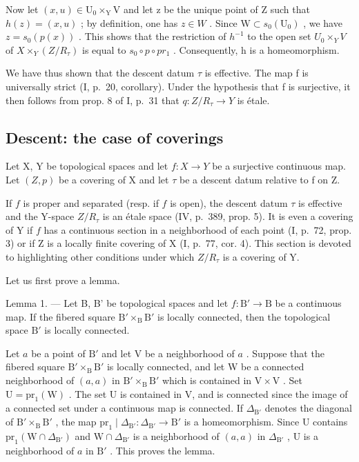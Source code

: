 Now let \((x,u)\in\mathrm{U}_{0}\times_{\mathrm{Y}}\mathrm{V}\) and let z be the unique point of Z such that \(h(z)=(x,u)\) ; by definition, one has \(z\in W\) . Since \(\mathrm{W}\subset s_{0}(\mathrm{U}_{0})\) , we have \(z=s_{0}(p(x))\) . This shows that the restriction of \(h^{-1}\) to the open set \(U_{0}\times_{Y}V\) of \(X\times_{Y}(Z/R_{\tau})\) is equal to \(s_{0}\circ p\circ pr_{1}\) . Consequently, h is a homeomorphism.

We have thus shown that the descent datum \(\tau\) is effective. The map f is universally strict (I, p.~20, corollary). Under the hypothesis that f is surjective, it then follows from prop. 8 of I, p.~31 that \(q: Z/R_{\tau} \to Y\) is étale.

\subsection{Descent: the case of coverings}

Let X, Y be topological spaces and let \(f: X \to Y\) be a surjective continuous map. Let \((Z, p)\) be a covering of X and let \(\tau\) be a descent datum relative to f on Z.

If \(f\) is proper and separated (resp. if \(f\) is open), the descent datum \(\tau\) is effective and the Y-space \(Z/R_{\tau}\) is an étale space (IV, p.~389, prop. 5). It is even a covering of Y if \(f\) has a continuous section in a neighborhood of each point (I, p.~72, prop. 3) or if Z is a locally finite covering of X (I, p.~77, cor. 4). This section is devoted to highlighting other conditions under which \(Z/R_{\tau}\) is a covering of Y.

Let us first prove a lemma.

Lemma 1. --- Let B, B' be topological spaces and let \(f: \mathrm{B}' \to \mathrm{B}\) be a continuous map. If the fibered square \(\mathrm{B}' \times_{\mathrm{B}} \mathrm{B}'\) is locally connected, then the topological space \(\mathrm{B}'\) is locally connected.

Let \(a\) be a point of \(\mathrm{B}'\) and let V be a neighborhood of \(a\) . Suppose that the fibered square \(\mathrm{B}' \times_{\mathrm{B}} \mathrm{B}'\) is locally connected, and let W be a connected neighborhood of \((a, a)\) in \(\mathrm{B}' \times_{\mathrm{B}} \mathrm{B}'\) which is contained in \(\mathrm{V} \times \mathrm{V}\) . Set \(\mathrm{U} = \mathrm{pr}_1(\mathrm{W})\) . The set U is contained in V, and is connected since the image of a connected set under a continuous map is connected. If \(\Delta_{\mathrm{B}'}\) denotes the diagonal of \(\mathrm{B}' \times_{\mathrm{B}} \mathrm{B}'\) , the map \(\mathrm{pr}_1 \mid \Delta_{\mathrm{B}'}: \Delta_{\mathrm{B}'} \to \mathrm{B}'\) is a homeomorphism. Since U contains \(\mathrm{pr}_1(\mathrm{W} \cap \Delta_{\mathrm{B}'})\) and \(\mathrm{W} \cap \Delta_{\mathrm{B}'}\) is a neighborhood of \((a, a)\) in \(\Delta_{\mathrm{B}'}\) , U is a neighborhood of \(a\) in \(\mathrm{B}'\) . This proves the lemma.


